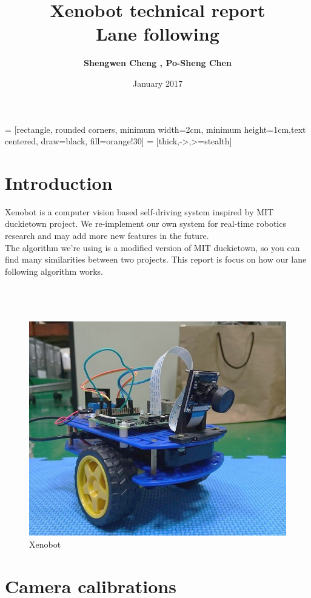 \documentclass{article}
\title{Xenobot technical report \\  Lane following}
\author{\textbf{Shengwen Cheng , Po-Sheng Chen}}
\date{January 2017}
\begin{document}
\maketitle

 = [rectangle, rounded corners, minimum width=2cm, minimum height=1cm,text centered, draw=black, fill=orange!30]
 = [thick,->,>=stealth]

\section{Introduction}
Xenobot is a computer vision based self-driving system inspired by MIT duckietown project. We re-implement our own system for real-time robotics research and may add more new features in the future.
\\
The algorithm we're using is a modified version of MIT duckietown, so you can find many similarities between two projects. This report is focus on how our lane following algorithm works.
\\
\\
\\
\\

\begin{figure}[ht]
  \label{fig:xenobot}
  \centering
  \includegraphics[scale=0.3]{graphs/xenobot.PNG}
  \caption{Xenobot}
\end{figure}

\clearpage

\section{Camera calibrations}
\end{document}
